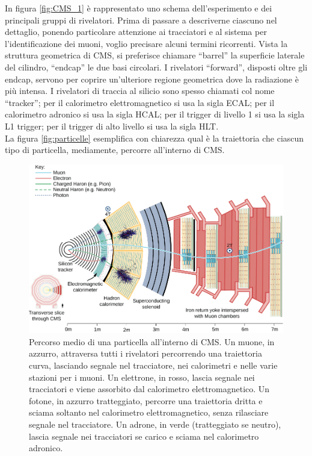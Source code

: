 \noindent In figura \ref{fig:CMS_1} \`e rappresentato uno schema dell'esperimento e dei principali gruppi di rivelatori. Prima di passare a descriverne ciascuno nel dettaglio, ponendo particolare attenzione ai tracciatori e al sistema per l'identificazione dei muoni, voglio precisare alcuni termini ricorrenti. Vista la struttura geometrica di CMS, si preferisce chiamare ``barrel'' la superficie laterale del cilindro, ``endcap'' le due basi circolari. I rivelatori ``forward'', disposti oltre gli endcap, servono per coprire un'ulteriore regione geometrica dove la radiazione \`e pi\`u intensa. I rivelatori di traccia al silicio sono spesso chiamati col nome ``tracker''; per il calorimetro elettromagnetico si usa la sigla ECAL; per il calorimetro adronico si usa la sigla HCAL; per il trigger di livello 1 si usa la sigla L1 trigger; per il trigger di alto livello si usa la sigla HLT.\\
La figura \ref{fig:particelle} esemplifica con chiarezza qual \`e la traiettoria che ciascun tipo di particella, mediamente, percorre all'interno di CMS.

\begin{figure}[!htb]
  \centering
    \includegraphics[width=.99\textwidth]{figures/CMS_particles.jpg}
  \caption{Percorso medio di una particella all'interno di CMS. Un muone, in azzurro, attraversa tutti i rivelatori percorrendo una traiettoria curva, lasciando segnale nel tracciatore, nei calorimetri e nelle varie stazioni per i muoni. Un elettrone, in rosso, lascia segnale nei tracciatori e viene assorbito dal calorimetro elettromagnetico. Un fotone, in azzurro tratteggiato, percorre una traiettoria dritta e sciama soltanto nel calorimetro elettromagnetico, senza rilasciare segnale nel tracciatore. Un adrone, in verde (tratteggiato se neutro), lascia segnale nei tracciatori se carico e sciama nel calorimetro adronico.}
  \label{fig:CMS_particles}
\end{figure}

